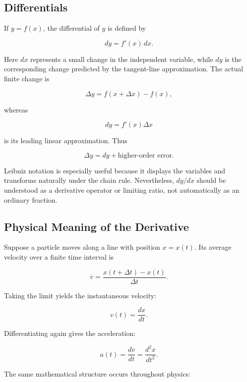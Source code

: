 \subsection{Differentials}

If $y=f(x)$, the differential of $y$ is defined by

\begin{equation}
\boxed{
dy=f'(x)\,dx.
}
\label{eq:differential}
\end{equation}

Here $dx$ represents a small change in the independent variable, while $dy$ is the corresponding change predicted by the tangent-line approximation. The actual finite change is

\[
\Delta y=f(x+\Delta x)-f(x),
\]

whereas

\[
dy=f'(x)\Delta x
\]

is its leading linear approximation. Thus

\[
\Delta y=dy+\text{higher-order error}.
\]

Leibniz notation is especially useful because it displays the variables and transforms naturally under the chain rule. Nevertheless, $dy/dx$ should be understood as a derivative operator or limiting ratio, not automatically as an ordinary fraction.

\subsection{Physical Meaning of the Derivative}

Suppose a particle moves along a line with position $x=x(t)$. Its average velocity over a finite time interval is

\[
\overline v
=
\frac{x(t+\Delta t)-x(t)}{\Delta t}.
\]

Taking the limit yields the instantaneous velocity:

\begin{equation}
\boxed{
v(t)=\frac{dx}{dt}.
}
\label{eq:velocity-derivative}
\end{equation}

Differentiating again gives the acceleration:

\begin{equation}
\boxed{
a(t)=\frac{dv}{dt}=\frac{d^2x}{dt^2}.
}
\label{eq:acceleration-derivative}
\end{equation}

The same mathematical structure occurs throughout physics:

